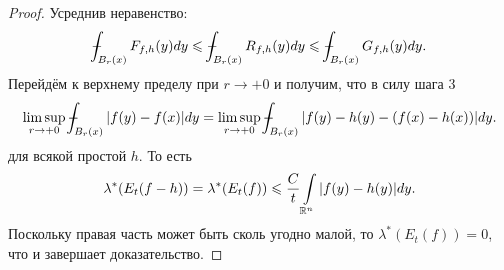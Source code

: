 \begin{proof}
    Усреднив неравенство: \[\dashint_{B_r(x)} F_{f, h}(y)dy \leq \dashint_{B_r(x)}R_{f, h}(y)dy \leq \dashint_{B_r(x)}G_{f, h}(y)dy.\]
    Перейдём к верхнему пределу при $r \rightarrow +0$ и получим, что в силу шага 3 \[\limsup\limits_{r \rightarrow +0}\dashint_{B_r(x)}|f(y) - f(x)|dy = \limsup\limits_{r \rightarrow +0} \dashint_{B_r(x)} |f(y) - h(y) - (f(x) - h(x))|dy.\]
    для всякой простой $h$. То есть \[\lambda^*(E_t(f - h)) = \lambda^*(E_t(f)) \leqslant \dfrac{C}{t}\int\limits_{\mathbb{R}^n}|f(y) - h(y)|dy.\]
    Поскольку правая часть может быть сколь угодно малой, то $\lambda^*(E_t(f)) = 0$, что и завершает доказательство.
\end{proof}

